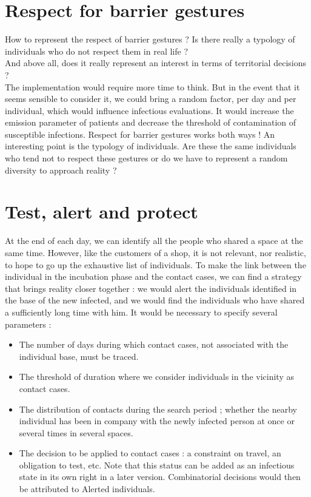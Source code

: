 \newpage

\section{Respect for barrier gestures}

How to represent the respect of barrier gestures ? Is there really a typology of individuals who do not respect them in real life ?\\
And above all, does it really represent an interest in terms of territorial decisions ?\\

The implementation would require more time to think. But in the event that it seems sensible to consider it, we could bring a random factor, per day and per individual, which would influence infectious evaluations. It would increase the emission parameter of patients and decrease the threshold of contamination of susceptible infections. Respect for barrier gestures works both ways ! An interesting point is the typology of individuals. Are these the same individuals who tend not to respect these gestures or do we have to represent a random diversity to approach reality ?

\newpage

\section{Test, alert and protect}

At the end of each day, we can identify all the people who shared a space at the same time. However, like the customers of a shop, it is not relevant, nor realistic, to hope to go up the exhaustive list of individuals. To make the link between the individual in the incubation phase and the contact cases, we can find a strategy that brings reality closer together : we would alert the individuals identified in the base of the new infected, and we would find the individuals who have shared a sufficiently long time with him. It would be necessary to specify several parameters :\\

\begin{itemize}
\item The number of days during which contact cases, not associated with the individual base, must be traced.
\item The threshold of duration where we consider individuals in the vicinity as contact cases.
\item The distribution of contacts during the search period ; whether the nearby individual has been in company with the newly infected person at once or several times in several spaces.
\item The decision to be applied to contact cases : a constraint on travel, an obligation to test, etc. Note that this status can be added as an infectious state in its own right in a later version. Combinatorial decisions would then be attributed to Alerted individuals.\\
\end{itemize}